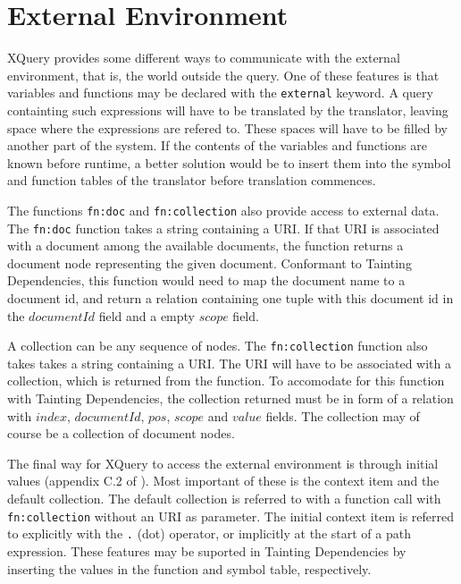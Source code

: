 \section{External Environment}
\label{sect:disc:ctxItem}

XQuery provides some different ways to communicate with the external environment, that is, the world outside the
query. One of these features is that variables and functions may be declared with the \texttt{external} keyword. A
query containting such expressions will have to be translated by the translator, leaving space where the
expressions are refered to. These spaces will have to be filled by another part of the system. If the contents of
the variables and functions are known before runtime, a better solution would be to insert them into the symbol
and function tables of the translator before translation commences.

The functions \texttt{fn:doc} and \texttt{fn:collection} also provide access to external data. The \texttt{fn:doc}
function takes a string containing a URI. If that URI is associated with a document among the available documents,
the function returns a document node representing the given document. Conformant to Tainting Dependencies, this
function would need to map the document name to a document id, and return a relation containing one tuple with
this document id in the $documentId$ field and a empty $scope$ field.

A collection can be any sequence of nodes. The \texttt{fn:collection} function also takes takes a string
containing a URI. The URI will have to be associated with a collection, which is returned from the function. To
accomodate for this function with Tainting Dependencies, the collection returned must be in form of a relation
with $index$, $documentId$, $pos$, $scope$ and $value$ fields. The collection may of course be a collection of
document nodes.

The final way for XQuery to access the external environment is through initial values (appendix C.2 of
\cite{w3c00}). Most important of these is the context item and the default collection. The default collection is
referred to with a function call with \texttt{fn:collection} without an URI as parameter. The initial context item
is referred to explicitly with the \verb!.! (dot) operator, or implicitly at the start of a path expression. These
features may be suported in Tainting Dependencies by inserting the values in the function and symbol table,
respectively.